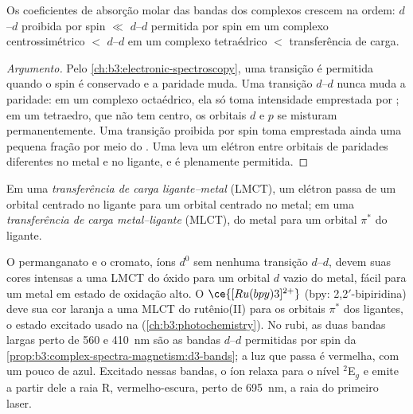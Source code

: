\begin{proposition}\label{prop:b3:complex-spectra-magnetism:intensity-order}
Os coeficientes de absorção molar das bandas dos complexos crescem na ordem:
$d$--$d$ proibida por spin $\ll$ $d$--$d$ permitida por spin em um complexo centrossimétrico $<$ $d$--$d$
em um complexo tetraédrico $<$ transferência de carga.
\end{proposition}

\begin{proof}[Argumento]
Pelo \cref{ch:b3:electronic-spectroscopy}, uma transição é permitida quando o spin é
conservado e a paridade muda. Uma transição $d$--$d$ nunca muda a paridade: em um
complexo octaédrico, ela só toma intensidade emprestada por ; em
um tetraedro, que não tem centro, os orbitais $d$ e $p$ se misturam permanentemente.
Uma transição proibida por spin toma emprestada ainda uma pequena fração por meio do
. Uma  leva um elétron
entre orbitais de paridades diferentes no metal e no ligante, e é plenamente permitida.
\end{proof}

\begin{definition}\label{def:b3:complex-spectra-magnetism:ct}
Em uma \emph{transferência de carga ligante--metal}
(LMCT), um elétron passa de um orbital centrado no ligante para um orbital centrado no
metal; em uma \emph{transferência de carga metal--ligante}
(MLCT), do metal para um orbital $\pi^*$ do ligante.
\end{definition}

O permanganato e o cromato, íons $d^0$ sem nenhuma transição $d$--$d$, devem suas cores
intensas a uma LMCT do óxido para um orbital $d$ vazio do metal, fácil para um metal em
estado de oxidação alto. O $\ce{[Ru(bpy)3]^{2+}}$ (bpy: 2,2$'$-bipiridina) deve sua cor laranja a uma MLCT
do rutênio(II) para os orbitais $\pi^*$ dos ligantes, o estado excitado usado na  (\cref{ch:b3:photochemistry}). No rubi, as duas bandas largas perto de 560 e
\qty{410}{nm} são as bandas $d$--$d$ permitidas por spin da
\cref{prop:b3:complex-spectra-magnetism:d3-bands}; a luz que passa é vermelha, com um
pouco de azul. Excitado nessas bandas, o íon relaxa para o nível $^2$E$_g$ e emite a partir
dele a raia R, vermelho-escura, perto de \qty{695}{nm}, a raia do primeiro laser.

